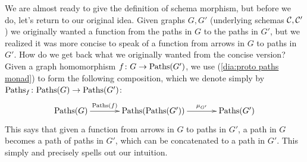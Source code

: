\documentclass[CT4S-EN-RU]{subfiles}
\begin{document}
\begin{exerciseRUS}
\end{exerciseRUS}

\begin{blockENG}
We are almost ready to give the definition of schema morphism, but before we do, let's return to our original idea. Given graphs $G,G'$ (underlying schemas $\mathcal{C},\mathcal{C}'$) we originally wanted a function from the paths in $G$ to the paths in $G'$, but we realized it was more concise to speak of a function from arrows in $G$ to paths in $G'$. How do we get back what we originally wanted from the concise version? Given a graph homomorphism $f\colon G\rightarrow\textnormal{Paths}(G')$, we use (\ref{dia:proto paths monad}) to form the following composition, which we denote simply by $\textnormal{Paths}_f\colon\textnormal{Paths}(G)\rightarrow\textnormal{Paths}(G')$:
\begin{align}\label{dia:kleisli comp in graph}
\xymatrix@=35pt{\Paths(G)\ar[r]^-{\Paths(f)}&\Paths(\Paths(G'))\ar[r]^-{\mu_{G'}}&\Paths(G')}
\end{align}
This says that given a function from arrows in $G$ to paths in $G'$, a path in $G$ becomes a path of paths in $G'$, which can be concatenated to a path in $G'$. This simply and precisely spells out our intuition.
\end{blockENG}

\begin{blockRUS}
\end{blockRUS}
\end{document}
